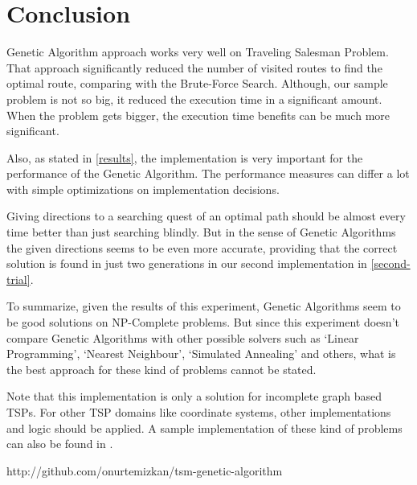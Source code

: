 \documentclass[journal,transmag]{IEEEtran}
\begin{document}
    \pagebreak

    \section{Conclusion}

    Genetic Algorithm approach works very well on Traveling Salesman Problem.
    That approach significantly reduced the number of visited routes to find the
    optimal route, comparing with the Brute-Force Search. Although, our sample
    problem is not so big, it reduced the execution time in a significant
    amount. When the problem gets bigger, the execution time benefits can be
    much more significant.

    Also, as stated in \ref{results}, the implementation is very important for
    the performance of the Genetic Algorithm. The performance measures can
    differ a lot with simple optimizations on implementation decisions.

    Giving directions to a searching quest of an optimal path should be almost
    every time better than just searching blindly. But in the sense of Genetic
    Algorithms the given directions seems to be even more accurate, providing
    that the correct solution is found in just two generations in our second
    implementation in \ref{second-trial}.

    To summarize, given the results of this experiment, Genetic Algorithms seem
    to be good solutions on NP-Complete problems. But since this experiment
    doesn't compare Genetic Algorithms with other possible solvers such as
    `Linear Programming', `Nearest Neighbour', `Simulated Annealing' and
    others, what is the best approach for these kind of problems cannot be
    stated.

    Note that this implementation is only a solution
    for incomplete graph based TSPs. For other TSP domains like coordinate
    systems, other implementations and logic should be applied. A sample
    implementation of these kind of problems can also be found in
    \cite{code_repository}.

    \ifCLASSOPTIONcaptionsoff
      \newpage
    \fi

    \begin{thebibliography}{1}

    http://github.com/onurtemizkan/tsm-genetic-algorithm
    \end{thebibliography}

    
\end{document}
